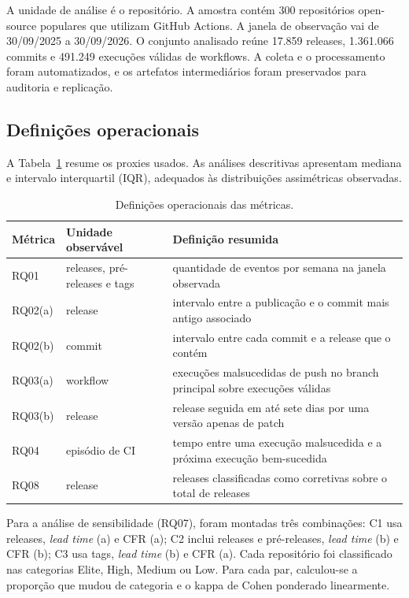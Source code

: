 \documentclass[12pt]{article}
\begin{document}
A unidade de análise é o repositório. A amostra contém 300 repositórios
open-source populares que utilizam GitHub Actions. A janela de observação vai
de 30/09/2025 a 30/09/2026. O conjunto analisado reúne 17.859 releases,
1.361.066 commits e 491.249 execuções válidas de workflows. A coleta e o
processamento foram automatizados, e os artefatos intermediários foram
preservados para auditoria e replicação.

\subsection{Definições operacionais}

A Tabela~\ref{tab:definicoes} resume os proxies usados. As análises
descritivas apresentam mediana e intervalo interquartil (IQR), adequados às
distribuições assimétricas observadas.

\begin{table}[htbp]
  \centering
  \caption{Definições operacionais das métricas.}
  \label{tab:definicoes}
  \small
  \begin{tabular}{p{1.6cm}p{4.1cm}p{6.2cm}}
    \toprule
    Métrica & Unidade observável & Definição resumida \\
    \midrule
    RQ01 & releases, pré-releases e tags &
      quantidade de eventos por semana na janela observada \\
    RQ02(a) & release &
      intervalo entre a publicação e o commit mais antigo associado \\
    RQ02(b) & commit &
      intervalo entre cada commit e a release que o contém \\
    RQ03(a) & workflow &
      execuções malsucedidas de push no branch principal sobre execuções válidas \\
    RQ03(b) & release &
      release seguida em até sete dias por uma versão apenas de patch \\
    RQ04 & episódio de CI &
      tempo entre uma execução malsucedida e a próxima execução bem-sucedida \\
    RQ08 & release &
      releases classificadas como corretivas sobre o total de releases \\
    \bottomrule
  \end{tabular}
\end{table}

Para a análise de sensibilidade (RQ07), foram montadas três combinações:
C1 usa releases, \textit{lead time} (a) e CFR (a); C2 inclui releases e
pré-releases, \textit{lead time} (b) e CFR (b); C3 usa tags, \textit{lead
time} (b) e CFR (a). Cada repositório foi classificado nas categorias Elite,
High, Medium ou Low. Para cada par, calculou-se a proporção que mudou de
categoria e o kappa de Cohen ponderado linearmente.
\end{document}
